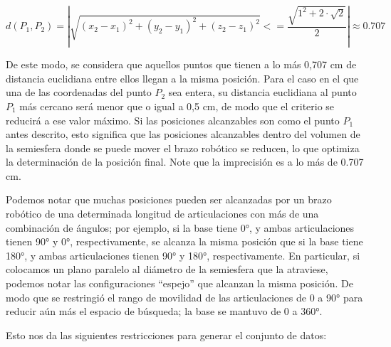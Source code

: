 \begin{equation}
	d(P_1, P_2) = |\sqrt{(x_2 - x_1)^2 + (y_2 - y_1)^2 + (z_2 - z_1)^2} <= \frac{\sqrt{1^2 + 2\cdot\sqrt{2}}}{2}| \approx 0.707
\end{equation}

De este modo, se considera que aquellos puntos que tienen a lo más 0,707 cm de distancia euclidiana entre ellos llegan a la misma posición. Para el caso en el que una de las coordenadas del punto $P_2$ sea entera, su distancia euclidiana al punto $P_1$ más cercano será menor que o igual a 0,5 cm, de modo que el criterio se reducirá a ese valor máximo. Si las posiciones alcanzables son como el punto $P_1$ antes descrito, esto significa que las posiciones alcanzables dentro del volumen de la semiesfera donde se puede mover el brazo robótico se reducen, lo que optimiza la determinación de la posición final. Note que la imprecisión es a lo más de 0.707 cm. 

Podemos notar que muchas posiciones pueden ser alcanzadas por un brazo robótico de una determinada longitud de articulaciones con más de una combinación de ángulos; por ejemplo, si la base tiene 0°, y ambas articulaciones tienen 90° y 0°, respectivamente, se alcanza la misma posición que si la base tiene 180°, y ambas articulaciones tienen 90° y 180°, respectivamente. En particular, si colocamos un plano paralelo al diámetro de la semiesfera que la atraviese, podemos notar las configuraciones ``espejo'' que alcanzan la misma posición. De modo que se restringió el rango de movilidad de las articulaciones de 0 a 90° para reducir aún más el espacio de búsqueda; la base se mantuvo de 0 a 360°. 


Esto nos da las siguientes restricciones para generar el conjunto de datos:

